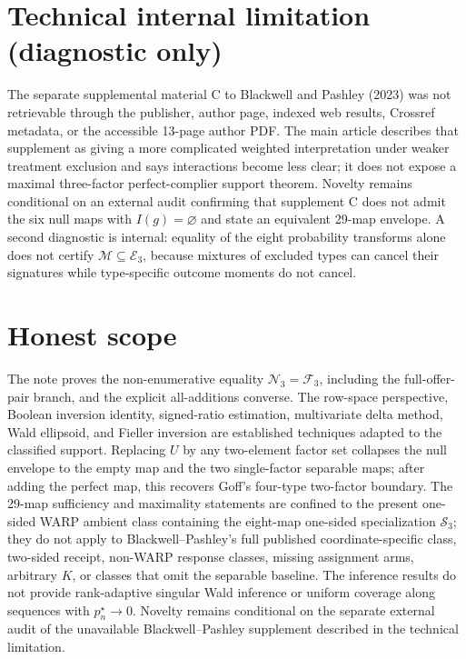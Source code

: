 \documentclass{article}
\begin{document}
\section*{Technical internal limitation (diagnostic only)}

The separate supplemental material C to Blackwell and Pashley (2023) was not retrievable through the publisher, author page, indexed web results, Crossref metadata, or the accessible 13-page author PDF. The main article describes that supplement as giving a more complicated weighted interpretation under weaker treatment exclusion and says interactions become less clear; it does not expose a maximal three-factor perfect-complier support theorem. Novelty remains conditional on an external audit confirming that supplement C does not admit the six null maps with \(I(g)=\varnothing\) and state an equivalent 29-map envelope. A second diagnostic is internal: equality of the eight probability transforms alone does not certify \(\mathcal M\subseteq\mathcal E_3\), because mixtures of excluded types can cancel their signatures while type-specific outcome moments do not cancel.

\section{Honest scope}

The note proves the non-enumerative equality \(\mathcal N_3=\mathcal F_3\), including the full-offer-pair branch, and the explicit all-additions converse. The row-space perspective, Boolean inversion identity, signed-ratio estimation, multivariate delta method, Wald ellipsoid, and Fieller inversion are established techniques adapted to the classified support. Replacing \(U\) by any two-element factor set collapses the null envelope to the empty map and the two single-factor separable maps; after adding the perfect map, this recovers Goff's four-type two-factor boundary. The 29-map sufficiency and maximality statements are confined to the present one-sided WARP ambient class containing the eight-map one-sided specialization \(\mathcal S_3\); they do not apply to Blackwell--Pashley's full published coordinate-specific class, two-sided receipt, non-WARP response classes, missing assignment arms, arbitrary \(K\), or classes that omit the separable baseline. The inference results do not provide rank-adaptive singular Wald inference or uniform coverage along sequences with \(p_n^\star\to0\). Novelty remains conditional on the separate external audit of the unavailable Blackwell--Pashley supplement described in the technical limitation.
\end{document}
